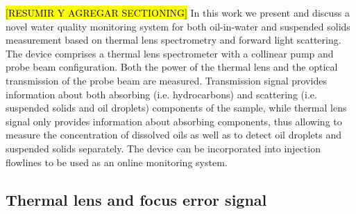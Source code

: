 \documentclass[9pt,twocolumn,twoside]{osajnl}
\begin{document}
\hl{[RESUMIR Y AGREGAR SECTIONING]} In this work we present and discuss a novel water quality monitoring system for both oil-in-water and suspended solids measurement based on thermal lens spectrometry and forward light scattering. The device comprises a thermal lens spectrometer with a collinear pump and probe beam configuration. Both the power of the thermal lens and the optical transmission of the probe beam are measured. Transmission signal provides information about both absorbing (i.e. hydrocarbons) and scattering (i.e. suspended solids and oil droplets) components of the sample, while thermal lens signal only provides information about absorbing components, thus allowing to measure the concentration of dissolved oils as well as to detect oil droplets and suspended solids separately. The device can be incorporated into injection flowlines to be used as an online monitoring system.



\subsection{Thermal lens and focus error signal}
\end{document}
